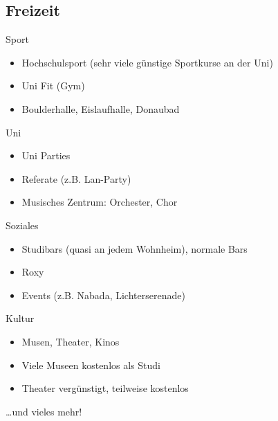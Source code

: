 \documentclass[
	aspectratio=169, 
	10pt 
]{beamer}
\begin{document}
\subsection{Freizeit}
\begin{frame}{\insertsubsection}
    \begin{fancycolumns}[T, columns=2]
        \begin{definition}{Sport}
            \begin{itemize}
                \item Hochschulsport (sehr viele günstige Sportkurse an der Uni)
                \item Uni Fit (Gym)
                \item Boulderhalle, Eislaufhalle, Donaubad
            \end{itemize}
        \end{definition}

        \begin{definition}{Uni}
            \begin{itemize}
                \item Uni Parties
                \item Referate (z.B. Lan-Party)
                \item Musisches Zentrum: Orchester, Chor
            \end{itemize}
        \end{definition}
        
        \nextcolumn
        \begin{definition}{Soziales}
            \begin{itemize}
                \item Studibars (quasi an jedem Wohnheim), normale Bars
                \item Roxy
                \item Events (z.B. Nabada, Lichterserenade) 
            \end{itemize}
        \end{definition}

        \begin{definition}{Kultur}
            \begin{itemize}
                \item Musen, Theater, Kinos
                \item Viele Museen kostenlos als Studi
                \item Theater vergünstigt, teilweise kostenlos
            \end{itemize}
        \end{definition}

    \end{fancycolumns}
    \dots und vieles mehr!
\end{frame}
\end{document}
